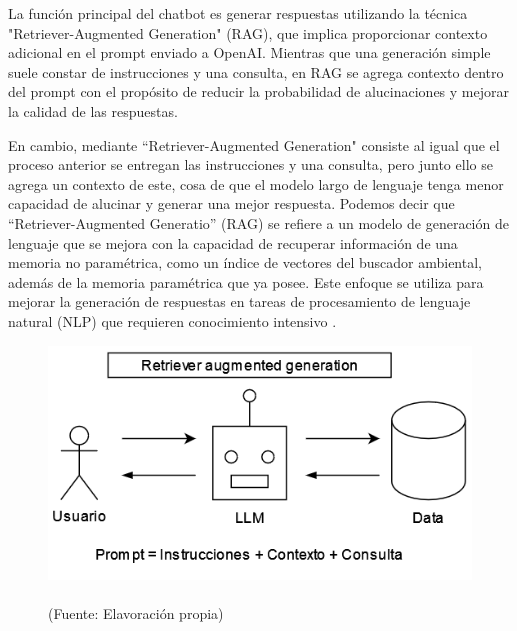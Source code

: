 La función principal del chatbot es generar respuestas utilizando la técnica "Retriever-Augmented Generation" (RAG), 
que implica proporcionar contexto adicional en el prompt enviado a OpenAI. Mientras que una generación simple suele 
constar de instrucciones y una consulta, en RAG se agrega contexto dentro del prompt con el propósito de reducir la 
probabilidad de alucinaciones y mejorar la calidad de las respuestas. 


En cambio, mediante ``Retriever-Augmented Generation" 
consiste al igual que el proceso anterior se entregan las instrucciones y una consulta, pero junto ello se agrega un contexto 
de este, cosa de que el modelo largo de lenguaje tenga menor capacidad de alucinar y generar una mejor respuesta. Podemos decir
que ``Retriever-Augmented Generatio'' (RAG) se refiere a un modelo de generación de lenguaje que se mejora con la capacidad 
de recuperar información de una memoria no paramétrica, como un índice de vectores del buscador ambiental, además de la 
memoria paramétrica que ya posee. Este enfoque se utiliza para mejorar la generación de respuestas en tareas de procesamiento 
de lenguaje natural (NLP) que requieren conocimiento intensivo \cite{raq}.

\begin{figure}[ht!]
    \centering
    \includegraphics[width=.4\textwidth]{figures/huemul5.png}
    \caption[]{\\
    {\scriptsize (Fuente: Elavoración propia)}}
    \label{fig:chatbot1}
\end{figure}